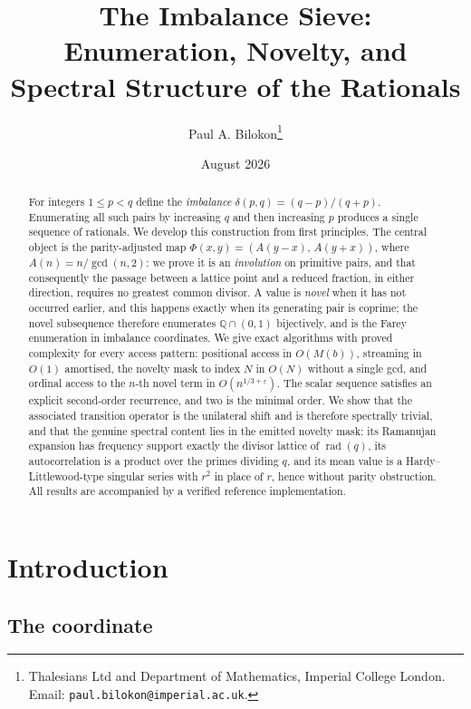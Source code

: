 \documentclass[11pt,a4paper]{article}
\title{The Imbalance Sieve:\\
Enumeration, Novelty, and Spectral Structure of the Rationals}
\author{Paul A. Bilokon\thanks{Thalesians Ltd and Department of Mathematics,
Imperial College London. Email: \texttt{paul.bilokon@imperial.ac.uk}.}}
\date{August 2026}
\theoremstyle{plain}
\theoremstyle{definition}
\theoremstyle{remark}
\DeclareMathOperator{\rad}{rad}
\newcommand{\Q}{\mathbb{Q}}
\begin{document}
\maketitle

\begin{abstract}
For integers $1 \le p < q$ define the \emph{imbalance}
$\delta(p,q) = (q-p)/(q+p)$. Enumerating all such pairs by increasing $q$ and
then increasing $p$ produces a single sequence of rationals. We develop this
construction from first principles. The central object is the parity-adjusted
map $\Phi(x,y) = (A(y-x),\,A(y+x))$, where $A(n) = n/\gcd(n,2)$: we prove it is
an \emph{involution} on primitive pairs, and that consequently the passage
between a lattice point and a reduced fraction, in either direction, requires no
greatest common divisor. A value is \emph{novel} when it has not occurred
earlier, and this happens exactly when its generating pair is coprime; the novel
subsequence therefore enumerates $\Q \cap (0,1)$ bijectively, and is the Farey
enumeration in imbalance coordinates. We give exact algorithms with proved
complexity for every access pattern: positional access in $O(M(b))$, streaming
in $O(1)$ amortised, the novelty mask to index $N$ in $O(N)$ without a single
gcd, and ordinal access to the $n$-th novel term in $O(n^{1/3+\varepsilon})$.
The scalar sequence satisfies an explicit second-order recurrence, and two is
the minimal order. We show that the associated transition operator is the
unilateral shift and is therefore spectrally trivial, and that the genuine
spectral content lies in the emitted novelty mask: its Ramanujan expansion has
frequency support exactly the divisor lattice of $\rad(q)$, its autocorrelation
is a product over the primes dividing $q$, and its mean value is a
Hardy--Littlewood-type singular series with $r^2$ in place of $r$, hence without
parity obstruction. All results are accompanied by a verified reference
implementation.
\end{abstract}

\tableofcontents

\section{Introduction}

\subsection{The coordinate}
\end{document}
